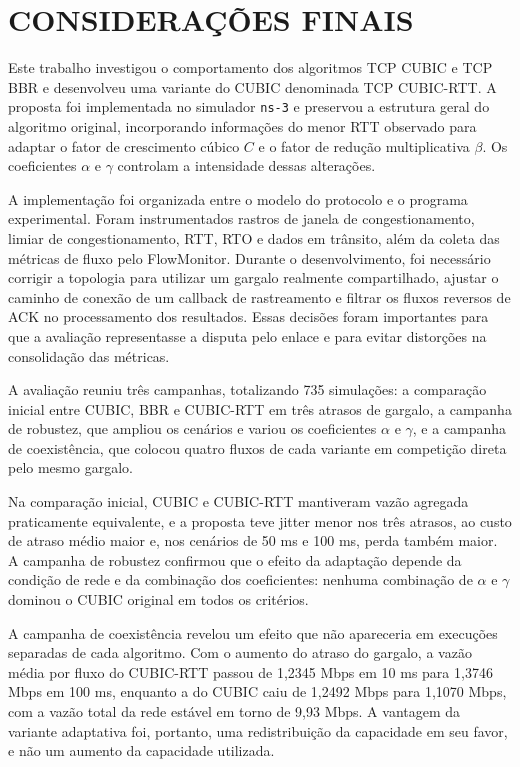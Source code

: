 \chapter{CONSIDERAÇÕES FINAIS}

Este trabalho investigou o comportamento dos algoritmos TCP CUBIC e TCP BBR e desenvolveu uma variante do CUBIC denominada TCP CUBIC-RTT. A proposta foi implementada no simulador \texttt{ns-3} e preservou a estrutura geral do algoritmo original, incorporando informações do menor RTT observado para adaptar o fator de crescimento cúbico $C$ e o fator de redução multiplicativa $\beta$. Os coeficientes $\alpha$ e $\gamma$ controlam a intensidade dessas alterações.

A implementação foi organizada entre o modelo do protocolo e o programa experimental. Foram instrumentados rastros de janela de congestionamento, limiar de congestionamento, RTT, RTO e dados em trânsito, além da coleta das métricas de fluxo pelo FlowMonitor. Durante o desenvolvimento, foi necessário corrigir a topologia para utilizar um gargalo realmente compartilhado, ajustar o caminho de conexão de um callback de rastreamento e filtrar os fluxos reversos de ACK no processamento dos resultados. Essas decisões foram importantes para que a avaliação representasse a disputa pelo enlace e para evitar distorções na consolidação das métricas.

A avaliação reuniu três campanhas, totalizando 735 simulações: a comparação inicial entre CUBIC, BBR e CUBIC-RTT em três atrasos de gargalo, a campanha de robustez, que ampliou os cenários e variou os coeficientes $\alpha$ e $\gamma$, e a campanha de coexistência, que colocou quatro fluxos de cada variante em competição direta pelo mesmo gargalo.

Na comparação inicial, CUBIC e CUBIC-RTT mantiveram vazão agregada praticamente equivalente, e a proposta teve jitter menor nos três atrasos, ao custo de atraso médio maior e, nos cenários de 50 ms e 100 ms, perda também maior. A campanha de robustez confirmou que o efeito da adaptação depende da condição de rede e da combinação dos coeficientes: nenhuma combinação de $\alpha$ e $\gamma$ dominou o CUBIC original em todos os critérios.

A campanha de coexistência revelou um efeito que não apareceria em execuções separadas de cada algoritmo. Com o aumento do atraso do gargalo, a vazão média por fluxo do CUBIC-RTT passou de 1,2345 Mbps em 10 ms para 1,3746 Mbps em 100 ms, enquanto a do CUBIC caiu de 1,2492 Mbps para 1,1070 Mbps, com a vazão total da rede estável em torno de 9,93 Mbps. A vantagem da variante adaptativa foi, portanto, uma redistribuição da capacidade em seu favor, e não um aumento da capacidade utilizada.

